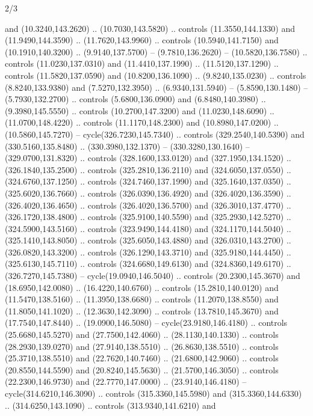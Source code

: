 \begin{flagdescription}{2/3}
\begin{scope}[xshift=0.5\flaglength,yshift=0.5\flagwidth,scale=\stretchfactor]
\begin{scope}[scale=0.001645\flagwidth,yshift=65mm,xshift=-63mm]
\begin{scope}[y=0.80pt, x=0.80pt, yscale=-1,]
\begin{scope}[cm={{1.33333,0.0,0.0,1.33333,(0.0,1e-05)}}]
  and (10.3240,143.2620) .. (10.7030,143.5820) .. controls (11.3550,144.1330)
  and (11.9490,144.3590) .. (11.7620,143.9960) .. controls (10.5940,141.7150)
  and (10.1910,140.3200) .. (9.9140,137.5700) -- (9.7810,136.2620) --
  (10.5820,136.7580) .. controls (11.0230,137.0310) and (11.4410,137.1990) ..
  (11.5120,137.1290) .. controls (11.5820,137.0590) and (10.8200,136.1090) ..
  (9.8240,135.0230) .. controls (8.8240,133.9380) and (7.5270,132.3950) ..
  (6.9340,131.5940) -- (5.8590,130.1480) -- (5.7930,132.2700) .. controls
  (5.6800,136.0900) and (6.8480,140.3980) .. (9.3980,145.5550) .. controls
  (10.2700,147.3200) and (11.0230,148.6090) .. (11.0700,148.4220) .. controls
  (11.1170,148.2300) and (10.8980,147.0200) .. (10.5860,145.7270) --
  cycle(326.7230,145.7340) .. controls (329.2540,140.5390) and
  (330.5160,135.8480) .. (330.3980,132.1370) -- (330.3280,130.1640) --
  (329.0700,131.8320) .. controls (328.1600,133.0120) and (327.1950,134.1520) ..
  (326.1840,135.2500) .. controls (325.2810,136.2110) and (324.6050,137.0550) ..
  (324.6760,137.1250) .. controls (324.7460,137.1990) and (325.1640,137.0350) ..
  (325.6020,136.7660) .. controls (326.0390,136.4920) and (326.4020,136.3590) ..
  (326.4020,136.4650) .. controls (326.4020,136.5700) and (326.3010,137.4770) ..
  (326.1720,138.4800) .. controls (325.9100,140.5590) and (325.2930,142.5270) ..
  (324.5900,143.5160) .. controls (323.9490,144.4180) and (324.1170,144.5040) ..
  (325.1410,143.8050) .. controls (325.6050,143.4880) and (326.0310,143.2700) ..
  (326.0820,143.3200) .. controls (326.1290,143.3710) and (325.9180,144.4450) ..
  (325.6130,145.7110) .. controls (324.6680,149.6130) and (324.8360,149.6170) ..
  (326.7270,145.7380) -- cycle(19.0940,146.5040) .. controls (20.2300,145.3670)
  and (18.6950,142.0080) .. (16.4220,140.6760) .. controls (15.2810,140.0120)
  and (11.5470,138.5160) .. (11.3950,138.6680) .. controls (11.2070,138.8550)
  and (11.8050,141.1020) .. (12.3630,142.3090) .. controls (13.7810,145.3670)
  and (17.7540,147.8440) .. (19.0900,146.5080) -- cycle(23.9180,146.4180) ..
  controls (25.6680,145.5270) and (27.7500,142.4060) .. (28.1130,140.1330) ..
  controls (28.2930,139.0270) and (27.9140,138.5510) .. (26.8630,138.5510) ..
  controls (25.3710,138.5510) and (22.7620,140.7460) .. (21.6800,142.9060) ..
  controls (20.8550,144.5590) and (20.8240,145.5630) .. (21.5700,146.3050) ..
  controls (22.2300,146.9730) and (22.7770,147.0000) .. (23.9140,146.4180) --
  cycle(314.6210,146.3090) .. controls (315.3360,145.5980) and
  (315.3360,144.6330) .. (314.6250,143.1090) .. controls (313.9340,141.6210) and

\end{scope}
\end{scope}
\end{scope}
\end{scope}
\end{flagdescription}
